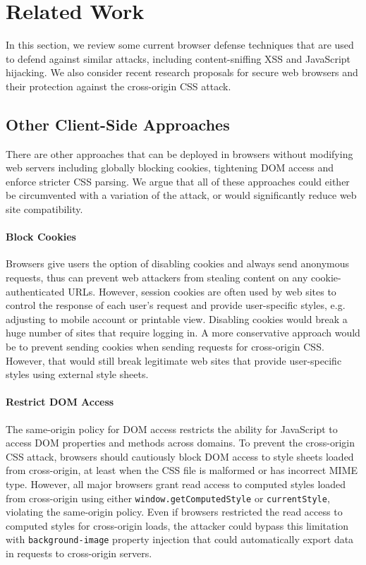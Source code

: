 \documentclass{acm_proc_article-sp}
\begin{document}
\section{Related Work} \label{sec:relatedwork}
In this section, we review some current browser defense techniques that are
used to defend against similar attacks, including content-sniffing XSS and
JavaScript hijacking. We also consider recent research proposals for secure
web browsers and their protection against the cross-origin CSS attack.

\subsection{Other Client-Side Approaches}
There are other approaches that can be deployed in browsers without modifying web servers including globally blocking cookies, tightening DOM access and enforce stricter CSS parsing.  We argue that all of these approaches could either be circumvented with a variation of the attack, or would significantly reduce web site compatibility.

\paragraph{Block Cookies}
Browsers give users the option of disabling cookies and always send anonymous requests, thus can prevent web attackers from stealing content on any cookie-authenticated URLs. However, session cookies are often used by web sites to control the response of each user's request and provide user-specific styles, e.g. adjusting to mobile account or printable view. Disabling cookies would break a huge number of sites that require logging in. A more conservative approach would be to prevent sending cookies when sending requests for cross-origin CSS. However, that would still break legitimate web sites that provide user-specific styles using external style sheets.

\paragraph{Restrict DOM Access}
The same-origin policy for DOM access restricts the ability for JavaScript to access DOM properties and methods across domains. To prevent the cross-origin CSS attack, browsers should cautiously block DOM access to style sheets loaded from cross-origin, at least when the CSS file is malformed or has incorrect MIME type. However, all major browsers grant read access to computed styles loaded from cross-origin using either \texttt{window.getComputedStyle} or \texttt{currentStyle}, violating the same-origin policy. Even if browsers restricted the read access to computed styles for cross-origin loads, the attacker could bypass this limitation with \texttt{background-image} property injection that could automatically export data in requests to cross-origin servers.
\end{document}
